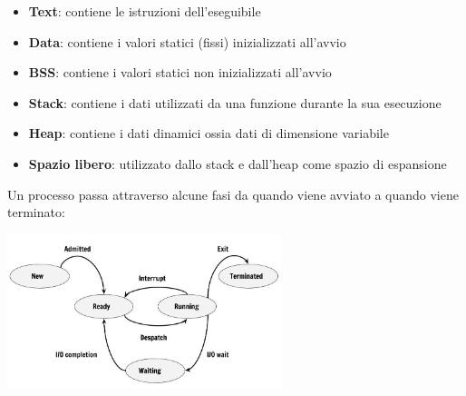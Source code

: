 \documentclass{article}
\begin{document}
        \begin{itemize}
            \item \textbf{Text}:
                contiene le istruzioni dell'eseguibile
            \item  \textbf{Data}:
                contiene i valori statici (fissi) inizializzati all'avvio
            \item  \textbf{BSS}:
                contiene i valori statici non inizializzati all'avvio
            \item \textbf{Stack}:
                contiene i dati utilizzati da una funzione durante la sua esecuzione
            \item \textbf{Heap}:
                contiene i dati dinamici ossia dati di dimensione variabile
            \item \textbf{Spazio libero}:
                utilizzato dallo stack e dall'heap come spazio di espansione  
        \end{itemize}
        Un processo passa attraverso alcune fasi da quando viene avviato a quando viene terminato:
%
        \begin{center}
            \includegraphics[width=0.6\textwidth]{immagini/Process-State-Diagram.jpg}
        \end{center}
\end{document}
